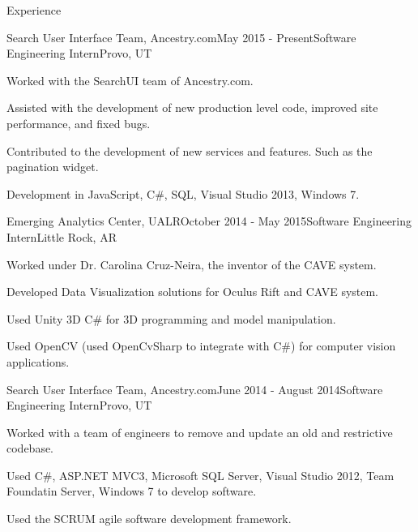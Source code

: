 \documentclass{resume} %
\begin{document}
\begin{rSection}{Experience}

\begin{rSubsection}{Search User Interface Team, Ancestry.com}{May 2015 - Present}{Software Engineering Intern}{Provo, UT}
	\item Worked with the SearchUI team of Ancestry.com.
	\item Assisted with the development of new production level code, improved site performance, and fixed bugs.
	\item Contributed to the development of new services and features. Such as the pagination widget.
	\item Development in JavaScript, C\#, SQL, Visual Studio 2013, Windows 7.
\end{rSubsection}

\begin{rSubsection}{Emerging Analytics Center, UALR}{October 2014 - May 2015}{Software Engineering Intern}{Little Rock, AR}
	\item Worked under Dr. Carolina Cruz-Neira, the inventor of the CAVE system.
	\item Developed Data Visualization solutions for Oculus Rift and CAVE system.
	\item Used Unity 3D C\# for 3D programming and model manipulation.
	\item Used OpenCV (used OpenCvSharp to integrate with C\#) for computer vision applications.
\end{rSubsection}

\begin{rSubsection}{Search User Interface Team, Ancestry.com}{June 2014 - August 2014}{Software Engineering Intern}{Provo, UT}
    \item Worked with a team of engineers to remove and update an old and restrictive codebase.
    \item Used C\#, ASP.NET MVC3, Microsoft SQL Server, Visual Studio 2012, Team Foundatin Server, Windows 7 to develop software.
	\item Used the SCRUM agile software development framework.
\end{rSubsection}

\end{rSection}
\end{document}
